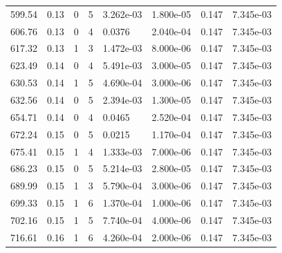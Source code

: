 \documentclass[preview]{standalone}
\begin{document}
{{{\begin{tabular}{L{1.2cm}C{1.2cm} C{0.3cm}C{0.5cm} C{1.4cm}C{1.4cm} C{1.4cm}C{1.4cm}}
  599.54  &  0.13  & 0     &  5 &  3.262e-03  & 1.800e-05  & 0.147 &  7.345e-03   \\ 
  606.76  &  0.13  & 0     &  4 &  0.0376  & 2.040e-04  & 0.147 &  7.345e-03   \\ 
  617.32  &  0.13  & 1     &  3 &  1.472e-03  & 8.000e-06  & 0.147 &  7.345e-03   \\ 
  623.49  &  0.14  & 0     &  4 &  5.491e-03  & 3.000e-05  & 0.147 &  7.345e-03   \\ 
  630.53  &  0.14  & 1     &  5 &  4.690e-04  & 3.000e-06  & 0.147 &  7.345e-03   \\ 
  632.56  &  0.14  & 0     &  5 &  2.394e-03  & 1.300e-05  & 0.147 &  7.345e-03   \\ 
  654.71  &  0.14  & 0     &  4 &  0.0465  & 2.520e-04  & 0.147 &  7.345e-03   \\ 
  672.24  &  0.15  & 0     &  5 &  0.0215  & 1.170e-04  & 0.147 &  7.345e-03   \\ 
  675.41  &  0.15  & 1     &  4 &  1.333e-03  & 7.000e-06  & 0.147 &  7.345e-03   \\ 
  686.23  &  0.15  & 0     &  5 &  5.214e-03  & 2.800e-05  & 0.147 &  7.345e-03   \\ 
  689.99  &  0.15  & 1     &  3 &  5.790e-04  & 3.000e-06  & 0.147 &  7.345e-03   \\ 
  699.33  &  0.15  & 1     &  6 &  1.370e-04  & 1.000e-06  & 0.147 &  7.345e-03   \\ 
  702.16  &  0.15  & 1     &  5 &  7.740e-04  & 4.000e-06  & 0.147 &  7.345e-03   \\ 
  716.61  &  0.16  & 1     &  6 &  4.260e-04  & 2.000e-06  & 0.147 &  7.345e-03   \\ 
\hline 
\end{tabular} 

}}}
\end{document}
